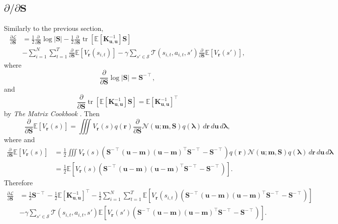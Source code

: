 \documentclass{article}
\theoremstyle{definition}
\theoremstyle{remark}
\DeclareMathOperator{\tr}{tr}
\newcommand{\Kuu}{\mathbf{K}_{\mathbf{u},\mathbf{u}}}
\newcommand{\dS}{\frac{\partial}{\partial\mathbf{S}}}
\begin{document}
\subsection{$\partial/\partial\mathbf{S}$}

Similarly to the previous section,
\[
  \begin{split}
    \frac{\partial\mathcal{L}}{\partial\mathbf{S}} &=
    \frac{1}{2}\dS\log|\mathbf{S}|
    -\frac{1}{2}\dS\tr[\mathbb{E}[\Kuu^{-1}]\mathbf{S}] \\
    &- \sum_{i=1}^N \sum_{t=1}^T \dS\mathbb{E}[V_{\mathbf{r}}(s_{i,t})] -
      \gamma\sum_{s' \in \mathcal{S}} \mathcal{T}(s_{i,t}, a_{i,t},
      s')\dS\mathbb{E}[V_{\mathbf{r}}(s')],
  \end{split}
\]
where
\[ \dS\log|\mathbf{S}| = \mathbf{S}^{-\intercal}, \]
and
\[ \dS\tr[\mathbb{E}[\Kuu^{-1}]\mathbf{S}] = \mathbb{E}[\Kuu^{-1}]^\intercal \]
by \emph{The Matrix Cookbook} \cite{petersen2008matrix}. Then
\[ \dS\mathbb{E}[V_{\mathbf{r}}(s)] = \iiint V_{\mathbf{r}}(s) q(\mathbf{r}) \dS\mathcal{N}(\mathbf{u}; \mathbf{m}, \mathbf{S})
  q(\bm\lambda)\,d\mathbf{r}\,d\mathbf{u}\,d\bm\lambda, \]
where
and
\[
  \begin{split}
    \dS\mathbb{E}[V_{\mathbf{r}}(s)] &= \frac{1}{2}\iiint V_{\mathbf{r}}(s)
    (\mathbf{S}^{-\intercal}(\mathbf{u} - \mathbf{m})(\mathbf{u} -
    \mathbf{m})^\intercal\mathbf{S}^{-\intercal} - \mathbf{S}^{-\intercal})
    q(\mathbf{r}) \mathcal{N}(\mathbf{u};
    \mathbf{m}, \mathbf{S}) q(\bm\lambda)\,d\mathbf{r}\,d\mathbf{u}\,d\bm\lambda
    \\
    &= \frac{1}{2}\mathbb{E}[V_{\mathbf{r}}(s)(\mathbf{S}^{-\intercal}(\mathbf{u} -
    \mathbf{m})(\mathbf{u} - \mathbf{m})^\intercal\mathbf{S}^{-\intercal} -
    \mathbf{S}^{-\intercal})].
  \end{split}
\]
Therefore
\[
  \begin{split}
    \frac{\partial\mathcal{L}}{\partial\mathbf{S}} &=
    \frac{1}{2}\mathbf{S}^{-\intercal} -
    \frac{1}{2}\mathbb{E}[\Kuu^{-1}]^\intercal - \frac{1}{2}
    \sum_{i=1}^N\sum_{t=1}^T
    \mathbb{E}[V_{\mathbf{r}}(s_{i,t})(\mathbf{S}^{-\intercal}(\mathbf{u} -
    \mathbf{m})(\mathbf{u} - \mathbf{m})^\intercal\mathbf{S}^{-\intercal} -
    \mathbf{S}^{-\intercal})] \\
    &- \gamma\sum_{s' \in \mathcal{S}}\mathcal{T}(s_{i,t}, a_{i,t}, s')
    \mathbb{E}[V_{\mathbf{r}}(s')(\mathbf{S}^{-\intercal}(\mathbf{u} -
    \mathbf{m})(\mathbf{u} - \mathbf{m})^\intercal\mathbf{S}^{-\intercal} -
    \mathbf{S}^{-\intercal})].
  \end{split}
\]
\end{document}
